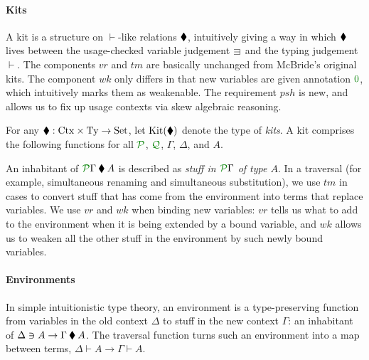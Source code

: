 \documentclass[submission,copyright,creativecommons]{eptcs}
\begin{document}
\paragraph{Kits}
A kit is a structure on $\vdash$-like relations $\mathbin{\blacklozenge}$, intuitively
giving a way in which $\mathbin{\blacklozenge}$ lives between the usage-checked variable
judgement $\lvar$ and the typing judgement $\vdash$.
The components $\mathit{vr}$ and $\mathit{tm}$ are basically unchanged from
McBride's original kits.
The component $\mathit{wk}$ only differs in that new variables are given
annotation $\rescomment 0$, which intuitively marks them as weakenable.
The requirement $\mathit{psh}$ is new, and allows us to fix up usage contexts
via skew algebraic reasoning.

\begin{definition}\label{def:kit}
  For any $\mathbin{\blacklozenge} : \mathrm{Ctx} \times \mathrm{Ty} \to \mathrm{Set}$, let
  $\operatorname{Kit}(\mathbin{\blacklozenge})$ denote the type of \emph{kits}.
  A kit comprises the following functions for all $\resctx P$, $\resctx Q$,
  $\Gamma$, $\Delta$, and $A$.
\end{definition}

An inhabitant of $\ctx{\Gamma}{P} \kitrel A$ is described as
\emph{stuff in $\ctx{\Gamma}{P}$ of type $A$}.
In a traversal (for example, simultaneous renaming and simultaneous
substitution), we use $\mathit{tm}$ in  cases to convert stuff
that has come from the environment into terms that replace variables.
We use $\mathit{vr}$ and $\mathit{wk}$ when binding new variables: $\mathit{vr}$
tells us what to add to the environment when it is being extended by a bound
variable, and $\mathit{wk}$ allows us to weaken all the other stuff in the
environment by such newly bound variables.

\paragraph{Environments}
In simple intuitionistic type theory, an
environment is a type-preserving function from variables in the old
context $\Delta$ to stuff in the new context $\Gamma$: an inhabitant
of $\Delta \ni A \to \Gamma \mathbin{\blacklozenge} A$.  The traversal function turns
such an environment into a map between terms,
$\Delta \vdash A \to \Gamma \vdash A$.
\end{document}
